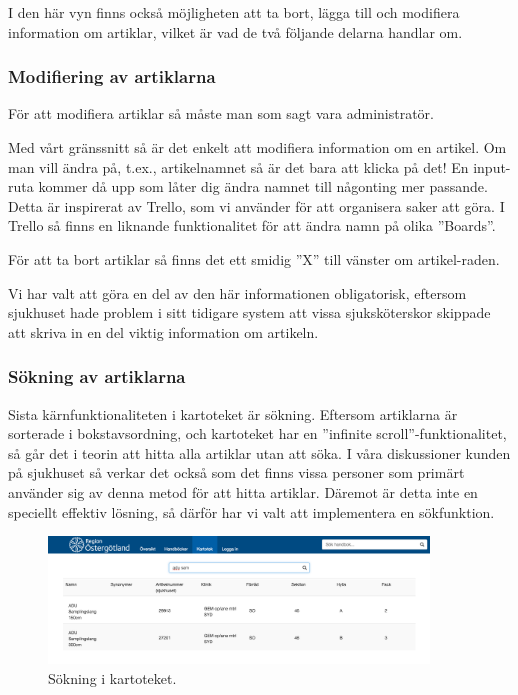 I den här vyn finns också möjligheten att ta bort, lägga till och modifiera
information om artiklar, vilket är vad de två följande delarna handlar om.

\clearpage
\subsubsection{Modifiering av artiklarna}
För att modifiera artiklar så måste man som sagt vara administratör.

Med vårt gränssnitt så är det enkelt att modifiera information om en artikel.
Om man vill ändra på, t.ex., artikelnamnet så är det bara att klicka på det!
En input-ruta kommer då upp som låter dig ändra namnet till någonting mer passande.
Detta är inspirerat av Trello, som vi använder för att organisera saker att göra.
I Trello så finns en liknande funktionalitet för att ändra namn på olika ''Boards''.

För att ta bort artiklar så finns det ett smidig ''X'' till vänster om artikel-raden.

Vi har valt att göra en del av den här informationen obligatorisk, eftersom
sjukhuset hade problem i sitt tidigare system att vissa sjuksköterskor skippade
att skriva in en del viktig information om artikeln.


\subsubsection{Sökning av artiklarna}
Sista kärnfunktionaliteten i kartoteket är sökning.
Eftersom artiklarna är sorterade i bokstavsordning,
och kartoteket har en ''infinite scroll''-funktionalitet,
så går det i teorin att hitta alla artiklar utan att söka.
I våra diskussioner kunden på sjukhuset så
verkar det också som det finns vissa personer som primärt använder
sig av denna metod för att hitta artiklar.
Däremot är detta inte en speciellt effektiv lösning, så därför
har vi valt att implementera en sökfunktion.

\begin{figure}[h!]
  \centering
  \includegraphics[width=0.9\textwidth]{images/site/kartsearch.png}
  \caption{Sökning i kartoteket.}
  \label{fig:kartsearch}
\end{figure}

